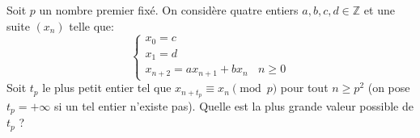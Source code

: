 \begin{exo}{}
Soit $p$ un nombre premier fixé. On considère quatre entiers $a,b,c,d\in \mathbb{Z}$ et une suite $(x_n)$ telle que:
$$\begin{cases}x_0=c \\x_1=d \\x_{n+2}=ax_{n+1}+bx_n ~~~~n\ge 0\end{cases}$$
Soit $t_p$ le plus petit entier tel que $x_{n+t_p}\equiv x_n\pmod p$ pour tout $n\ge p^2$ (on pose $t_p=+\infty$ si un tel entier n'existe pas). Quelle est la plus grande valeur possible de $t_p$ ?  \\~~\\
\end{exo}





